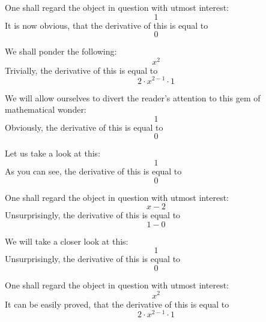 \documentclass{article}
\begin{document}
One shall regard the object in question with utmost interest:
\begin{equation}
1 
\end{equation}
It is now obvious, that the derivative of this is equal to
\begin{equation}
0 
\end{equation}

We shall ponder the following:
\begin{equation}
x ^{2 } 
\end{equation}
Trivially, the derivative of this is equal to
\begin{equation}
2 \cdot x ^{2 - 1 } \cdot 1 
\end{equation}

We will allow ourselves to divert the reader's attention to this gem of mathematical wonder:
\begin{equation}
1 
\end{equation}
Obviously, the derivative of this is equal to
\begin{equation}
0 
\end{equation}

Let us take a look at this:
\begin{equation}
1 
\end{equation}
As you can see, the derivative of this is equal to
\begin{equation}
0 
\end{equation}

One shall regard the object in question with utmost interest:
\begin{equation}
x - 2 
\end{equation}
Unsurprisingly, the derivative of this is equal to
\begin{equation}
1 - 0 
\end{equation}

We will take a closer look at this:
\begin{equation}
1 
\end{equation}
Unsurprisingly, the derivative of this is equal to
\begin{equation}
0 
\end{equation}

One shall regard the object in question with utmost interest:
\begin{equation}
x ^{2 } 
\end{equation}
It can be easily proved, that the derivative of this is equal to
\begin{equation}
2 \cdot x ^{2 - 1 } \cdot 1 
\end{equation}
\end{document}
